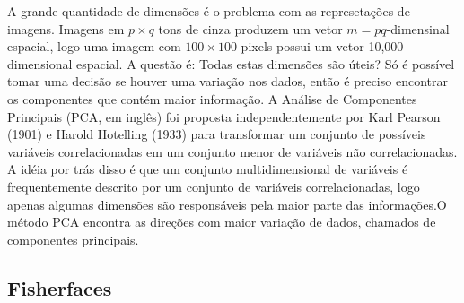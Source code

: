 A grande quantidade de dimensões é o problema com as represetações de imagens. Imagens em $p \times q$ tons de cinza produzem um vetor $m = pq$-dimensinal espacial, logo uma imagem com $100 \times 100$ pixels possui um vetor 10,000-dimensional espacial. A questão é: Todas estas dimensões são úteis? Só é possível tomar uma decisão se houver uma variação nos dados, então é preciso encontrar os componentes que contém maior informação. A Análise de Componentes Principais (PCA, em inglês) foi proposta independentemente por Karl Pearson (1901) e Harold Hotelling (1933) para transformar um conjunto de possíveis variáveis correlacionadas em um conjunto menor de variáveis não correlacionadas. A idéia por trás disso é que um conjunto multidimensional de variáveis é frequentemente descrito por um conjunto de variáveis correlacionadas, logo apenas algumas dimensões são responsáveis pela maior parte das informações.O método PCA encontra as direções com maior variação de dados, chamados de componentes principais.


\subsection*{Fisherfaces} %
\label{sub:fisherfaces}


